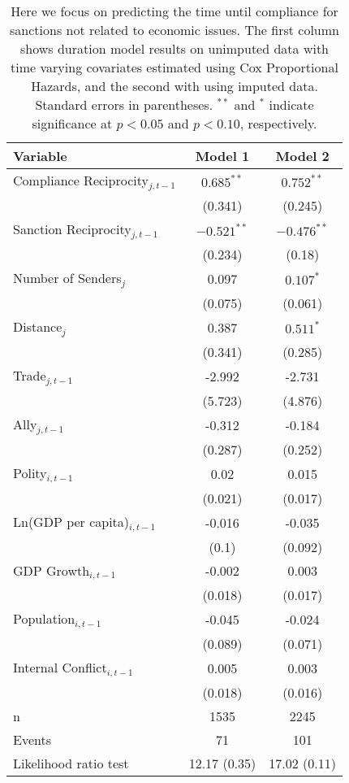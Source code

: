 \begin{table}[ht]
\centering
\begingroup\normalsize
\begin{tabular}{lcc}
 Variable & Model 1 & Model 2 \\ 
  \hline
\hline
Compliance Reciprocity$_{j,t-1}$ & $0.685^{\ast\ast}$ & $0.752^{\ast\ast}$ \\ 
   & (0.341) & (0.245) \\ 
  Sanction Reciprocity$_{j,t-1}$ & $-0.521^{\ast\ast}$ & $-0.476^{\ast\ast}$ \\ 
   & (0.234) & (0.18) \\ 
   \hline
Number of Senders$_{j}$ & 0.097 & $0.107^{\ast}$ \\ 
   & (0.075) & (0.061) \\ 
  Distance$_{j}$ & 0.387 & $0.511^{\ast}$ \\ 
   & (0.341) & (0.285) \\ 
  Trade$_{j,t-1}$ & -2.992 & -2.731 \\ 
   & (5.723) & (4.876) \\ 
  Ally$_{j,t-1}$ & -0.312 & -0.184 \\ 
   & (0.287) & (0.252) \\ 
   \hline
Polity$_{i,t-1}$ & 0.02 & 0.015 \\ 
   & (0.021) & (0.017) \\ 
  Ln(GDP per capita)$_{i,t-1}$ & -0.016 & -0.035 \\ 
   & (0.1) & (0.092) \\ 
  GDP Growth$_{i,t-1}$ & -0.002 & 0.003 \\ 
   & (0.018) & (0.017) \\ 
  Population$_{i,t-1}$ & -0.045 & -0.024 \\ 
   & (0.089) & (0.071) \\ 
  Internal Conflict$_{i,t-1}$ & 0.005 & 0.003 \\ 
   & (0.018) & (0.016) \\ 
   \hline
n & 1535 & 2245 \\ 
  Events & 71 & 101 \\ 
  Likelihood ratio test & 12.17 (0.35) & 17.02 (0.11) \\ 
   \hline
\hline
\end{tabular}
\endgroup
\caption{Here we focus on predicting the time until compliance for sanctions not related to economic issues. The first column shows duration model results on unimputed data with time varying covariates estimated using Cox Proportional Hazards, and the second with using imputed data. Standard errors in parentheses. $^{**}$ and $^{*}$ indicate significance at $p< 0.05 $ and $p< 0.10 $, respectively.} 
\label{tab:regResultsNonEconSanctions}
\end{table}
